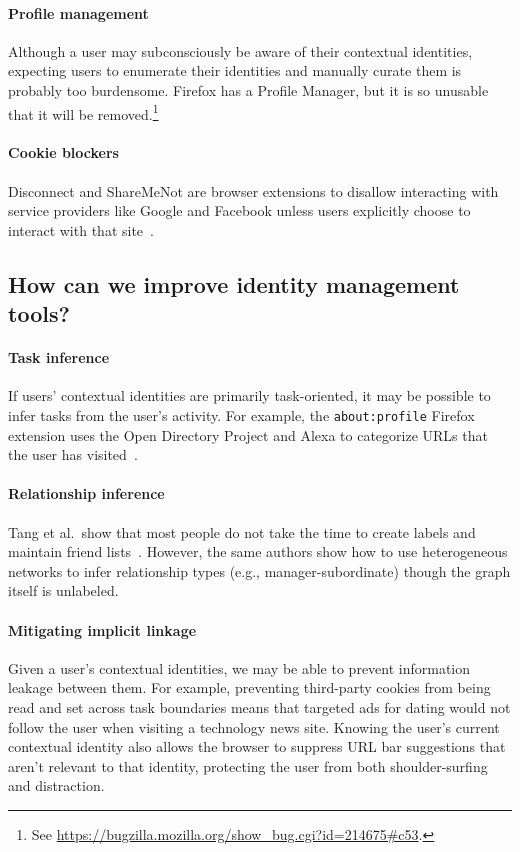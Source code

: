 \documentclass[10pt, conference, compsocconf]{IEEEtran}
\begin{document}
\paragraph{Profile management}
Although a user may subconsciously be aware of their contextual identities,
expecting users to enumerate their identities and manually curate them is
probably too burdensome. Firefox has a Profile Manager, but it is so unusable
that it will be removed.\footnote{See
\url{https://bugzilla.mozilla.org/show\_bug.cgi?id=214675\#c53}.}

\paragraph{Cookie blockers}
Disconnect and ShareMeNot are browser extensions to disallow interacting with
service providers like Google and Facebook unless users explicitly choose to
interact with that site~\cite{disconnect,franzi}.

\subsection{How can we improve identity management tools?}
\paragraph{Task inference}
If users' contextual identities are primarily task-oriented, it may be
possible to infer tasks from the user's activity. For example, the
\texttt{about:profile} Firefox extension uses the Open Directory Project and
Alexa to categorize URLs that the user has visited~\cite{aboutprofile}.

\paragraph{Relationship inference}
Tang et al.~show that most people do not take the time to create labels and
maintain friend lists~\cite{tang}. However, the same authors show how to use
heterogeneous networks to infer relationship types (e.g., manager-subordinate)
though the graph itself is unlabeled.

\paragraph{Mitigating implicit linkage}
Given a user's contextual identities, we may be able to prevent information
leakage between them.  For example, preventing third-party cookies from being
read and set across task boundaries means that targeted ads for dating would
not follow the user when visiting a technology news site. Knowing the user's
current contextual identity also allows the browser to suppress URL bar
suggestions that aren't relevant to that identity, protecting the user from
both shoulder-surfing and distraction.
\end{document}
